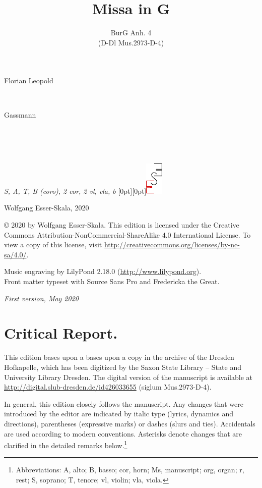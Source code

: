 \documentclass[parskip=full]{scrreprt}
\makeatletter
\DeclareRobustCommand{\sbseries}{\fontseries{sb}\selectfont}
\newcommand\fancytitlehead{
	\headingfont%
	\fontsize{80}{80}\selectfont\textcolor{black!80}{\@lastname.}\\[15pt]%
	\fontsize{60}{60}\selectfont\@ifundefined{@shorttitle}{\@title}{\@shorttitle}.%
}
\def\firstname#1{\def\@firstname{#1}}
\def\lastname#1{\def\@lastname{#1}}
\def\instrumentation#1{\def\@instrumentation{#1}}
\def\maketitle{%
\begin{titlepage}%
	\Large%
	{\@titlehead}%
	\vfill%
	{\strut\@firstname}\\%
	{\sbseries\color{oldred}\strut\@lastname}\\%
	{\strut\@namesuffix}%
	\vfill%
	{\sbseries\@title}\\%
	{\@subtitle}\\[\baselineskip]%
	{\itshape\@instrumentation}%
	\vfill%
	{\itshape\@parts}\hspace*{\fill}\raisebox{0pt}[0pt][0pt]{\includegraphics{ees_logo}}%
\end{titlepage}%
}
\newif\ifprintreport\printreportfalse
\makeatother
\begin{document}
\titlehead{\fancytitlehead}
\firstname{Florian Leopold}
\lastname{Gassmann}
\title{Missa in G}
\subtitle{BurG Anh. 4\\(D-Dl Mus.2973-D-4)}
\instrumentation{S, A, T, B (coro), 2 cor, 2 vl, vla, b}
\maketitle


\thispagestyle{empty}

\vspace*{\fill}

\hspace*{1em}Wolfgang Esser-Skala, 2020

© 2020 by Wolfgang Esser-Skala. This edition is licensed under the Creative Commons Attribution-NonCommercial-ShareAlike 4.0 International License. To view a copy of this license, visit \url{http://creativecommons.org/licenses/by-nc-sa/4.0/}. 

Music engraving by LilyPond 2.18.0 (\url{http://www.lilypond.org}).\\
Front matter typeset with Source Sans Pro and Fredericka the Great.

\textit{First version, May 2020}

\vspace*{2cm}

\ifprintreport
\chapter*{Critical Report.}

This edition bases upon a bases upon a copy in the archive of the Dresden Hofkapelle, which has been digitized by the Saxon State Library – State and University Library Dresden. The digital version of the manuscript is available at \url{http://digital.slub-dresden.de/id426033655} (siglum Mus.2973-D-4).

In general, this edition closely follows the manuscript. Any changes that were introduced by the editor are indicated by italic type (lyrics, dynamics and directions), parentheses (expressive marks) or dashes (slurs and ties). Accidentals are used according to modern conventions. Asterisks denote changes that are clarified in the detailed remarks below.\footnote{Abbreviations: A, alto; B, basso; cor, horn; Ms, manuscript; org, organ; r, rest; S, soprano; T, tenore; vl, violin; vla, viola.}
\end{document}
